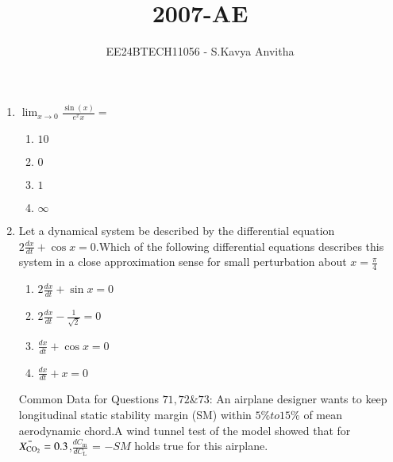 \documentclass[journal]{IEEEtran}
\begin{document}

\vspace{3cm}

\title{2007-AE}
\author{EE24BTECH11056 - S.Kavya Anvitha}
\maketitle
\bigskip

\renewcommand{\thefigure}{\theenumi}
\renewcommand{\thetable}{\theenumi}
\begin{enumerate}
\item $\lim_{x \to 0} \frac{\sin(x)}{e^xx} = $
\begin{enumerate}
    \item $10$
    \item $0$
    \item $1$
    \item $\infty$\\
\end{enumerate}
\item Let a dynamical system be described by the differential equation $2\frac{dx}{dt} + \cos{x} = 0$.Which of the following differential equations describes this system in a close approximation sense for small perturbation about $x = \frac{\pi}{4}$
\begin{enumerate}
    \item $2\frac{dx}{dt} + \sin{x} = 0$
    \item $2\frac{dx}{dt} - \frac{1}{\sqrt{2}} = 0$
    \item $\frac{dx}{dt} + \cos{x} = 0$
    \item $\frac{dx}{dt} + x = 0$\\
\end{enumerate}

Common Data for Questions $71, 72 \& 73$: An airplane designer wants to keep longitudinal static stability margin (SM) within $5\% to 15\%$ of mean  aerodynamic chord.A wind tunnel test of the model showed that for $\Bar{X_{\text{CO}_2}} = 0.3$,$\frac{dC_{\text{m}}}{dC_{\text{L}}}$ = $-SM$ holds true for this airplane.\\


\end{enumerate}
\end{document}
